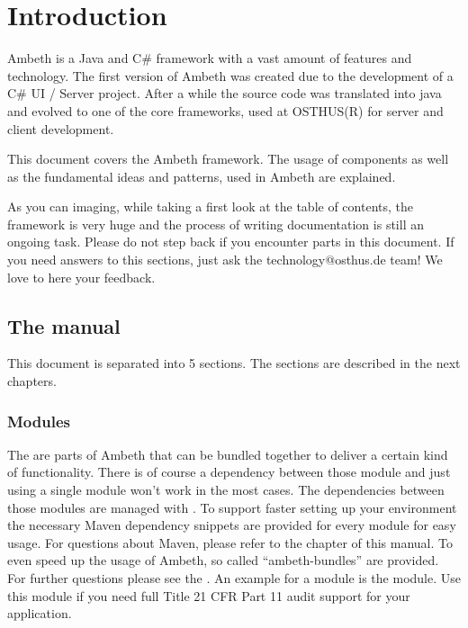 \chapter{Introduction}
\label{Introduction}


Ambeth is a Java and C\# framework with a vast amount of features and technology. The first version of Ambeth was created due to the development
of a C\# UI / Server project. After a while the source code was translated into java and evolved to one of the core frameworks, used at OSTHUS(R) for server and client development.

This document covers the Ambeth framework. The usage of components as well as the fundamental ideas and patterns, used in Ambeth are explained.

As you can imaging, while taking a first look at the table of contents, the framework is very huge and the process of writing documentation is still an ongoing task. Please do not step back if you encounter \TODO parts in this document. If you need answers to this sections, just ask the technology@osthus.de team! We love to here your feedback.

\section{The manual}
This document is separated into 5 sections. The sections are described in the next chapters.
\subsection{Modules}

The  are parts of Ambeth that can be bundled together to deliver a certain kind of functionality. There is of course a dependency between those module and 
just using a single module won't work in the most cases. The dependencies between those modules are managed with . To support faster setting up your environment the
necessary Maven dependency snippets are provided for every module for easy usage. For questions about Maven, please refer to the  chapter of this manual.
To even speed up the usage of Ambeth, so called "`ambeth-bundles"' are provided. For further questions please see the .
An example for a module is the  module. Use this module if you need full  Title 21 CFR Part 11 audit support for your application.

